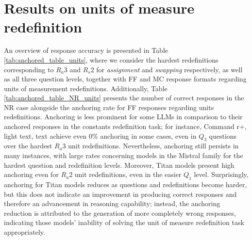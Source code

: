 \section{Results on units of measure redefinition}
\label{app:units_redefinition}




An overview of response accuracy is presented in Table \ref{tab:anchored_table_units}, where we consider the hardest redefinitions corresponding to $R_{a}3$ and $R_{s}2$ for \textit{assignment} and \textit{swapping} respectively, as well as all three question levels, together with FF and MC response formats regarding units of measurement redefinitions. Additionally, Table \ref{tab:anchored_table_NR_units} presents the number of correct responses in the NR case alongside the anchoring rate for FF responses regarding units redefinitions. Anchoring is less prominent for some LLMs in comparison to their anchored responses in the constants redefinition task; for instance, Command r+, light text, text achieve even 0\% anchoring in some cases, even in $Q_3$ questions over the hardest $R_a3$ unit redefinitions. Nevertheless, anchoring still persists in many instances, with large rates concerning models in the Mistral family for the hardest question and redefinition levels. Moreover, Titan models present high anchoring even for $R_a2$ unit redefinitions, even in the easier $Q_1$ level. Surprisingly, anchoring for Titan models reduces as questions and redefinitions become harder, but this does not indicate an improvement in producing correct responses and therefore an advancement in reasoning capability; instead, the anchoring reduction is attributed to the generation of more completely wrong responses, indicating those models' inability of solving the unit of measure redefinition task appropriately.

